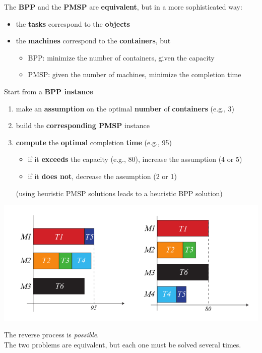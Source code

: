 The \textbf{BPP} and the \textbf{PMSP} are \textbf{equivalent}, but in a more sophisticated way:
\begin{itemize}
	\item the \textbf{tasks} correspond to the \textbf{objects}
	\item the \textbf{machines} correspond to the \textbf{containers}, but
	\begin{itemize}
		\item BPP: minimize the number of containers, given the capacity
		\item PMSP: given the number of machines, minimize the completion time
	\end{itemize}
\end{itemize}
Start from a \textbf{BPP instance}
\begin{enumerate}
	\item make an \textbf{assumption} on the optimal \textbf{number} of \textbf{containers} (e.g., 3)
	\item build the \textbf{corresponding PMSP} instance
	\item \textbf{compute} the \textbf{optimal} completion \textbf{time} (e.g., 95)
	\begin{itemize}
		\item if it \textbf{exceeds} the capacity (e.g., 80), increase the assumption (4 or 5)
		\item if it \textbf{does not}, decrease the assumption (2 or 1)
	\end{itemize}
	(using heuristic PMSP solutions leads to a heuristic BPP solution)
\end{enumerate}

\begin{center}
	\includegraphics[width=0.8\columnwidth]{img/interlude53}
\end{center}

The reverse process is \textit{possible}.\\

The two problems are equivalent, but each one must be solved several times.\\

